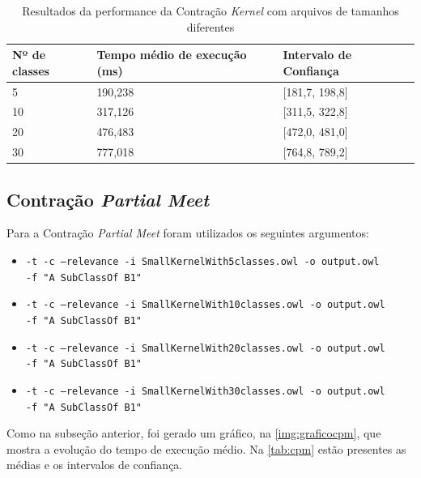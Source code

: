 \begin{table}[H]
	\centering
	\begin{tabular}{|l|l|l|}
		\hline
		\textbf{Nº de classes}  & \textbf{Tempo médio de execução (ms)} & \textbf{Intervalo de Confiança} \\ \hline
		5                                                 & 190,238                          & {[}181,7, 198,8{]}              \\ \hline
		10                                                & 317,126                          & {[}311,5, 322,8{]}              \\ \hline
		20                                                & 476,483                          & {[}472,0, 481,0{]}              \\ \hline
		30                                                & 777,018                          & {[}764,8, 789,2{]}              \\ \hline
	\end{tabular}
	\caption{Resultados da performance da Contração \textit{Kernel} com arquivos de tamanhos diferentes}
	\label{tab:ck}
\end{table}

\subsection{Contração \textit{Partial Meet}}

Para a Contração \textit{Partial Meet} foram utilizados os seguintes argumentos:

\begin{itemize}
	\item \texttt{-t -c --relevance -i SmallKernelWith5classes.owl -o output.owl \\ -f "A SubClassOf B1"}
	\item \texttt{-t -c --relevance -i SmallKernelWith10classes.owl -o output.owl \\ -f "A SubClassOf B1"}
	\item \texttt{-t -c --relevance -i SmallKernelWith20classes.owl -o output.owl \\ -f "A SubClassOf B1"}
	\item \texttt{-t -c --relevance -i SmallKernelWith30classes.owl -o output.owl \\ -f "A SubClassOf B1"}
\end{itemize}

Como na subseção anterior, foi gerado um gráfico, na \autoref{img:graficocpm}, que mostra a evolução do tempo de execução médio. Na \autoref{tab:cpm} estão presentes as médias e os intervalos de confiança.

